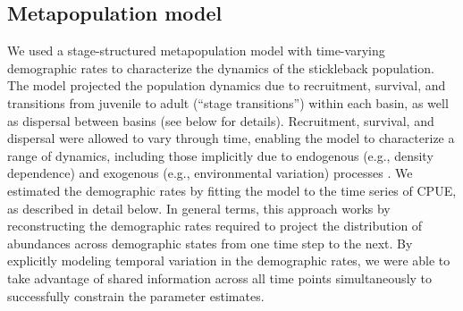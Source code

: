 \documentclass[11pt]{article}
\begin{document}
\subsection*{Metapopulation model} 

We used a stage-structured metapopulation model \citep{caswell2001matrix}
with time-varying demographic rates
to characterize the dynamics of the stickleback population. 
The model projected the population dynamics due to 
recruitment, survival, and transitions 
from juvenile to adult (``stage transitions'') within each basin,
as well as dispersal between basins (see below for details). 
Recruitment, survival, and dispersal were allowed to vary through time,
enabling the model to characterize a range of dynamics, 
including those implicitly due to endogenous (e.g., density dependence) 
and exogenous (e.g., environmental variation) processes
\citep{zeng1998, ives2012}. 
We estimated the demographic rates by  
fitting the model to the time series of CPUE,
as described in detail below. 
In general terms, this approach works by reconstructing the demographic rates required
to project the distribution of abundances across demographic states 
from one time step to the next. 
By explicitly modeling temporal variation in the demographic rates,
we were able to take advantage of shared information across all time points simultaneously 
to successfully constrain the parameter estimates.
\end{document}
